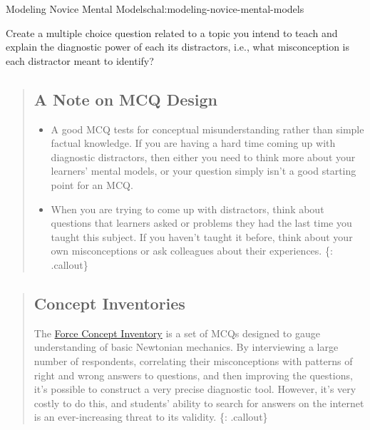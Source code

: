 \begin{challenge}{Modeling Novice Mental Models}{chal:modeling-novice-mental-models}

Create a multiple choice question related to a topic you intend to teach
and explain the diagnostic power of each its distractors, i.e., what
misconception is each distractor meant to identify?
\end{challenge}

\begin{quote}
\subsection{A Note on MCQ Design}\label{a-note-on-mcq-design}

\begin{itemize}
\itemsep1pt\parskip0pt
\item
  A good MCQ tests for conceptual misunderstanding rather than simple
  factual knowledge. If you are having a hard time coming up with
  diagnostic distractors, then either you need to think more about your
  learners' mental models, or your question simply isn't a good starting
  point for an MCQ.
\item
  When you are trying to come up with distractors, think about questions
  that learners asked or problems they had the last time you taught this
  subject. If you haven't taught it before, think about your own
  misconceptions or ask colleagues about their experiences. \{:
  .callout\}
\end{itemize}
\end{quote}

\begin{quote}
\subsection{Concept Inventories}\label{concept-inventories}

The \href{https://en.wikipedia.org/wiki/Force\_Concept\_Inventory}{Force
Concept Inventory} is a set of MCQs designed to gauge understanding of
basic Newtonian mechanics. By interviewing a large number of
respondents, correlating their misconceptions with patterns of right and
wrong answers to questions, and then improving the questions, it's
possible to construct a very precise diagnostic tool. However, it's very
costly to do this, and students' ability to search for answers on the
internet is an ever-increasing threat to its validity. \{: .callout\}
\end{quote}

